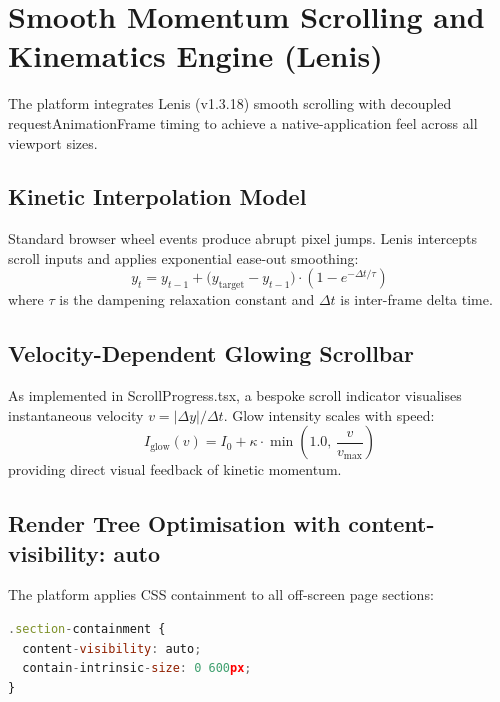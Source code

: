 \documentclass[12pt, a4paper, oneside]{report}
\def\textbf#1{#1}
\def\texttt#1{#1}
\def\&{and}
\begin{document}
\section{Smooth Momentum Scrolling \& Kinematics Engine (Lenis)}

The platform integrates \textbf{Lenis (v1.3.18)} smooth scrolling with
decoupled \texttt{requestAnimationFrame} timing to achieve a native-application
feel across all viewport sizes.

\subsection{Kinetic Interpolation Model}

Standard browser wheel events produce abrupt pixel jumps.  Lenis intercepts
scroll inputs and applies exponential ease-out smoothing:
\begin{equation}
  y_t = y_{t-1} + \bigl(y_{\text{target}} - y_{t-1}\bigr)
        \cdot \left(1 - e^{-\Delta t / \tau}\right)
\end{equation}
where $\tau$ is the dampening relaxation constant and $\Delta t$ is inter-frame
delta time.

\subsection{Velocity-Dependent Glowing Scrollbar}

As implemented in \texttt{ScrollProgress.tsx}, a bespoke scroll indicator
visualises instantaneous velocity $v = |\Delta y|/\Delta t$.  Glow intensity
scales with speed:
\begin{equation}
  I_{\text{glow}}(v) = I_0 + \kappa \cdot \min\!\left(1.0,\,\frac{v}{v_{\max}}\right)
\end{equation}
providing direct visual feedback of kinetic momentum.

\subsection{Render Tree Optimisation with \texttt{content-visibility: auto}}

The platform applies CSS containment to all off-screen page sections:

\begin{lstlisting}[language=JavaScript,
  caption={Off-Screen Render Containment in \texttt{index.css}}]
.section-containment {
  content-visibility: auto;
  contain-intrinsic-size: 0 600px;
}
\end{lstlisting}
\end{document}
